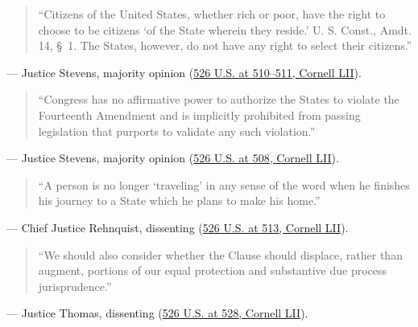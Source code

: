 \documentclass[12pt]{article}
\begin{document}
\begin{quote}
``Citizens of the United States, whether rich or poor, have the right to choose to be citizens `of the State wherein they reside.' U. S. Const., Amdt. 14, \S~1. The States, however, do not have any right to select their citizens.''
\end{quote}
\noindent --- Justice Stevens, majority opinion (\href{https://www.law.cornell.edu/supremecourt/text/98-97}{526 U.S. at 510--511, Cornell LII}).

\begin{quote}
``Congress has no affirmative power to authorize the States to violate the Fourteenth Amendment and is implicitly prohibited from passing legislation that purports to validate any such violation.''
\end{quote}
\noindent --- Justice Stevens, majority opinion (\href{https://www.law.cornell.edu/supremecourt/text/98-97}{526 U.S. at 508, Cornell LII}).

\begin{quote}
``A person is no longer `traveling' in any sense of the word when he finishes his journey to a State which he plans to make his home.''
\end{quote}
\noindent --- Chief Justice Rehnquist, dissenting (\href{https://www.law.cornell.edu/supct/html/98-97.ZD.html}{526 U.S. at 513, Cornell LII}).

\begin{quote}
``We should also consider whether the Clause should displace, rather than augment, portions of our equal protection and substantive due process jurisprudence.''
\end{quote}
\noindent --- Justice Thomas, dissenting (\href{https://www.law.cornell.edu/supct/html/98-97.ZD1.html}{526 U.S. at 528, Cornell LII}).
\end{document}
